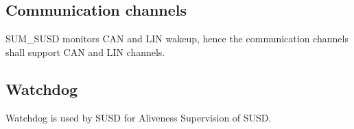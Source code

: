 



\subsection{Communication channels}
SUM_SUSD monitors CAN and LIN wakeup, hence the communication channels shall support CAN and LIN channels.


\subsection{Watchdog}
{Watchdog is used by SUSD for Aliveness Supervision of SUSD.}
{ }


